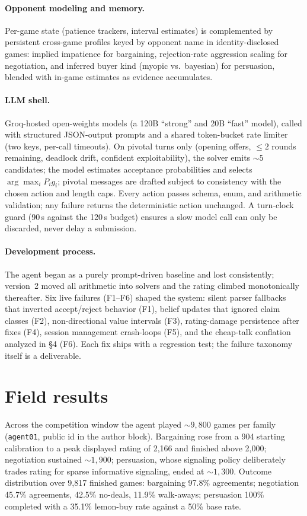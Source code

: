 \documentclass{article}
\begin{document}
\paragraph{Opponent modeling and memory.} Per-game state (patience trackers, interval estimates) is complemented by persistent cross-game profiles keyed by opponent name in identity-disclosed games: implied impatience for bargaining, rejection-rate aggression scaling for negotiation, and inferred buyer kind (myopic vs.\ bayesian) for persuasion, blended with in-game estimates as evidence accumulates.

\paragraph{LLM shell.} Groq-hosted open-weights models (a 120B ``strong'' and 20B ``fast'' model), called with structured JSON-output prompts and a shared token-bucket rate limiter (two keys, per-call timeouts). On pivotal turns only (opening offers, $\le 2$ rounds remaining, deadlock drift, confident exploitability), the solver emits ${\sim}5$ candidates; the model estimates acceptance probabilities and selects $\arg\max_i P_i g_i$; pivotal messages are drafted subject to consistency with the chosen action and length caps. Every action passes schema, enum, and arithmetic validation; any failure returns the deterministic action unchanged. A turn-clock guard (90\,s against the 120\,s budget) ensures a slow model call can only be discarded, never delay a submission.

\paragraph{Development process.} The agent began as a purely prompt-driven baseline and lost consistently; version~2 moved all arithmetic into solvers and the rating climbed monotonically thereafter. Six live failures (F1--F6) shaped the system: silent parser fallbacks that inverted accept/reject behavior (F1), belief updates that ignored claim classes (F2), non-directional value intervals (F3), rating-damage persistence after fixes (F4), session management crash-loops (F5), and the cheap-talk conflation analyzed in \S4 (F6). Each fix ships with a regression test; the failure taxonomy itself is a deliverable.

\section{Field results}
Across the competition window the agent played ${\sim}9{,}800$ games per family (\texttt{agent01}, public id in the author block). Bargaining rose from a 904 starting calibration to a peak displayed rating of 2{,}166 and finished above 2{,}000; negotiation sustained ${\sim}1{,}900$; persuasion, whose signaling policy deliberately trades rating for sparse informative signaling, ended at ${\sim}1{,}300$. Outcome distribution over 9{,}817 finished games: bargaining 97.8\% agreements; negotiation 45.7\% agreements, 42.5\% no-deals, 11.9\% walk-aways; persuasion 100\% completed with a 35.1\% lemon-buy rate against a 50\% base rate.
\end{document}
